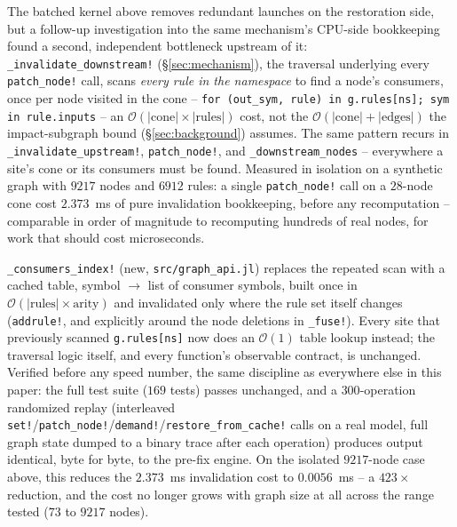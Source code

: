 \documentclass{article}
\begin{document}
The batched kernel above removes redundant launches on the restoration side, but a follow-up
investigation into the same mechanism's CPU-side bookkeeping found a second, independent
bottleneck upstream of it: \texttt{\_invalidate\_downstream!} (\S\ref{sec:mechanism}), the
traversal underlying every \texttt{patch\_node!} call, scans \emph{every rule in the namespace} to
find a node's consumers, once per node visited in the cone --
\texttt{for (out\_sym, rule) in g.rules[ns]; sym in rule.inputs} -- an
$\mathcal{O}(|\text{cone}| \times |\text{rules}|)$ cost, not the
$\mathcal{O}(|\text{cone}|+|\text{edges}|)$ the impact-subgraph bound (\S\ref{sec:background})
assumes. The same pattern recurs in \texttt{\_invalidate\_upstream!}, \texttt{patch\_node!}, and
\texttt{\_downstream\_nodes} -- everywhere a site's cone or its consumers must be found. Measured in
isolation on a synthetic graph with $9217$ nodes and $6912$ rules: a single \texttt{patch\_node!}
call on a $28$-node cone cost $2.373$~ms of pure invalidation bookkeeping, before any
recomputation -- comparable in order of magnitude to recomputing hundreds of real nodes, for work
that should cost microseconds.

\texttt{\_consumers\_index!} (new, \texttt{src/graph\_api.jl}) replaces the repeated scan with a
cached table, symbol $\to$ list of consumer symbols, built once in
$\mathcal{O}(|\text{rules}| \times \text{arity})$ and invalidated only where the rule set itself
changes (\texttt{addrule!}, and explicitly around the node deletions in \texttt{\_fuse!}). Every
site that previously scanned \texttt{g.rules[ns]} now does an $\mathcal{O}(1)$ table lookup
instead; the traversal logic itself, and every function's observable contract, is unchanged.
Verified before any speed number, the same discipline as everywhere else in this paper: the full
test suite ($169$ tests) passes unchanged, and a $300$-operation randomized replay (interleaved
\texttt{set!}/\texttt{patch\_node!}/\texttt{demand!}/\texttt{restore\_from\_cache!} calls on a real
model, full graph state dumped to a binary trace after each operation) produces output identical,
byte for byte, to the pre-fix engine. On the isolated $9217$-node case above, this reduces the
$2.373$~ms invalidation cost to $0.0056$~ms -- a $423\times$ reduction, and the cost no longer
grows with graph size at all across the range tested ($73$ to $9217$ nodes).
\end{document}
